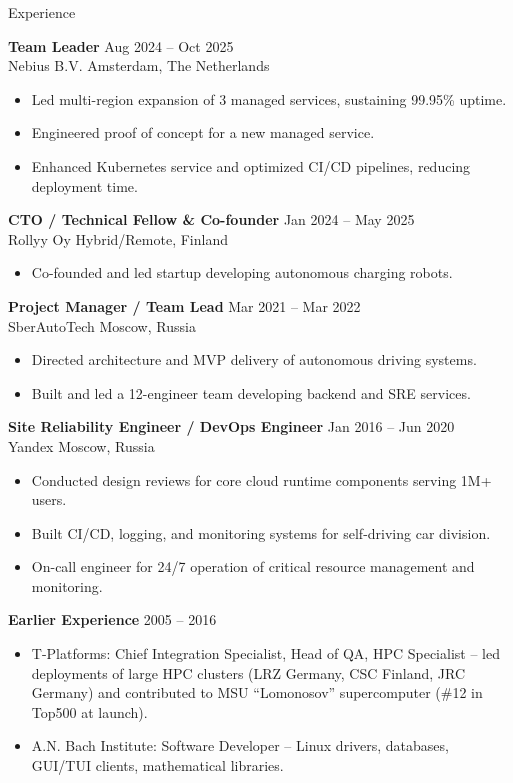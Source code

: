 \documentclass{resume} %
\begin{document}
\begin{rSection}{Experience}

\textbf{Team Leader} \hfill Aug 2024 -- Oct 2025 \\
Nebius B.V. \hfill Amsterdam, The Netherlands
\begin{itemize}
  \item Led multi-region expansion of 3 managed services, sustaining 99.95\% uptime.
  \item Engineered proof of concept for a new managed service.
  \item Enhanced Kubernetes service and optimized CI/CD pipelines, reducing deployment time.
\end{itemize}

\textbf{CTO / Technical Fellow \& Co-founder} \hfill Jan 2024 -- May 2025 \\
Rollyy Oy \hfill Hybrid/Remote, Finland
\begin{itemize}
  \item Co-founded and led startup developing autonomous charging robots.
\end{itemize}

\textbf{Project Manager / Team Lead} \hfill Mar 2021 -- Mar 2022 \\
SberAutoTech \hfill Moscow, Russia
\begin{itemize}
  \item Directed architecture and MVP delivery of autonomous driving systems.
  \item Built and led a 12-engineer team developing backend and SRE services.
\end{itemize}

\textbf{Site Reliability Engineer / DevOps Engineer} \hfill Jan 2016 -- Jun 2020 \\
Yandex \hfill Moscow, Russia
\begin{itemize}
  \item Conducted design reviews for core cloud runtime components serving 1M+ users.
  \item Built CI/CD, logging, and monitoring systems for self-driving car division.
  \item On-call engineer for 24/7 operation of critical resource management and monitoring.
\end{itemize}

\textbf{Earlier Experience} \hfill 2005 -- 2016
\begin{itemize}
  \item T-Platforms: Chief Integration Specialist, Head of QA, HPC Specialist – led deployments of large HPC clusters (LRZ Germany, CSC Finland, JRC Germany) and contributed to MSU “Lomonosov” supercomputer (\#12 in Top500 at launch).
  \item A.N. Bach Institute: Software Developer – Linux drivers, databases, GUI/TUI clients, mathematical libraries.
\end{itemize}

\end{rSection}
\end{document}
